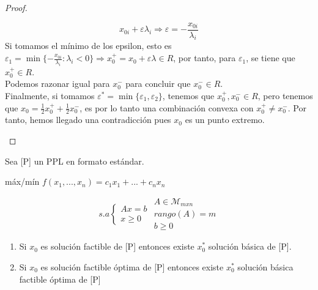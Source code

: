 \documentclass[11pt,fleqn]{book} %
\begin{document}
\begin{proof}
\begin{enumerate}
		$$
			 x_{0i}+\varepsilon\lambda_i\Rightarrow\varepsilon=-\frac{x_{0i}}{\lambda_i}
		$$
		 Si tomamos el mínimo de los epsilon, esto es $\varepsilon_1=\min\{-\frac{x_{0i}}{\lambda_i} : \lambda_i < 0\} \Rightarrow x_0^+=x_0+\varepsilon \lambda \in R$, por tanto, para $\varepsilon_1$, se tiene que $x_0^+ \in R$. \\
		 Podemos razonar igual para $x_0^-$ para concluir que $x_0^- \in R$.\\
		 Finalmente, si tomamos $\varepsilon^*=\min\{\varepsilon_1, \varepsilon_2\}$, tenemos que $x_0^+, x_0^- \in R$, pero tenemos que $x_0=\frac{1}{2}x_0^++\frac{1}{2}x_0^-$, es por lo tanto una combinación convexa con $x_0^+ \neq x_0^-$. Por tanto, hemos llegado una contradicción pues $x_0$ es un punto extremo.
	\end{enumerate}
\end{proof}
\begin{theorem}
	Sea [P] un PPL en formato estándar.
	\begin{center}
		máx/mín $f(x_1, ..., x_n)=c_1x_1+...+c_nx_n$
	\end{center}
	$$
		s.a \left\{ \begin{array}{c}
		Ax=b \\
		x\geq0
		\end{array}\right.
		\begin{array}{c}
			A\in \mathcal{M}_{mxn}\\
			rango(A)=m\\
			b\geq 0
		\end{array}
	$$
	\begin{enumerate}
		\item Si $x_0$ es solución factible de [P] entonces existe $x_0^*$ solución básica de [P].
		\item Si $x_0$ es solución factible óptima de [P] entonces existe $x_0^*$ solución básica factible óptima de [P]
	\end{enumerate}
\end{theorem}
\end{document}
